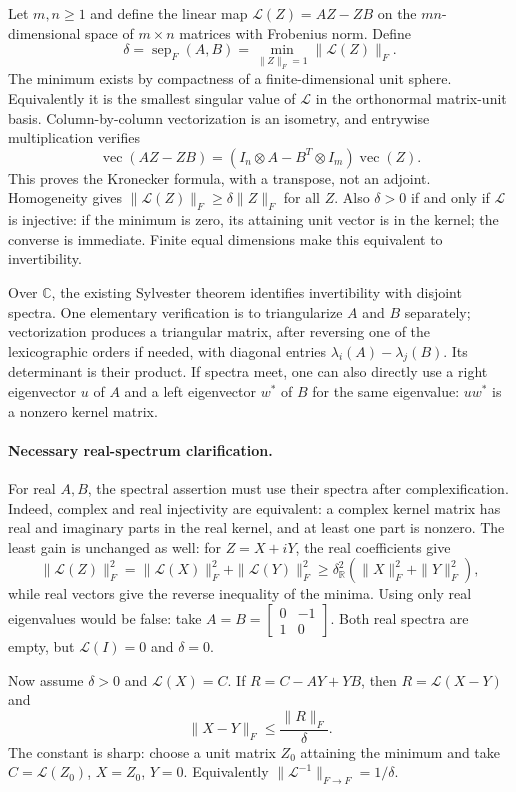 \documentclass[11pt,a4paper]{article}
\newcommand{\R}{\mathbb R}
\newcommand{\C}{\mathbb C}
\begin{document}
Let $m,n\ge1$ and define the linear map
$\mathcal L(Z)=AZ-ZB$ on the $mn$-dimensional space of $m\times n$
matrices with Frobenius norm. Define
\[
 \delta=\operatorname{sep}_F(A,B)
 =\min_{\|Z\|_F=1}\|\mathcal L(Z)\|_F.
\]
The minimum exists by compactness of a finite-dimensional unit sphere.
Equivalently it is the smallest singular value of $\mathcal L$ in
the orthonormal matrix-unit basis. Column-by-column vectorization is
an isometry, and entrywise multiplication verifies
\[
 \operatorname{vec}(AZ-ZB)
 =(I_n\otimes A-B^T\otimes I_m)\operatorname{vec}(Z).
\]
This proves the Kronecker formula, with a transpose, not an adjoint.
Homogeneity gives $\|\mathcal L(Z)\|_F\ge\delta\|Z\|_F$ for all $Z$.
Also $\delta>0$ if and only if $\mathcal L$ is injective: if the
minimum is zero, its attaining unit vector is in the kernel; the
converse is immediate. Finite equal dimensions make this equivalent
to invertibility.

Over $\C$, the existing Sylvester theorem identifies invertibility
with disjoint spectra. One elementary verification is to triangularize
$A$ and $B$ separately; vectorization produces a triangular matrix,
after reversing one of the lexicographic orders if needed, with
diagonal entries $\lambda_i(A)-\lambda_j(B)$. Its determinant is their
product. If spectra meet, one can also directly use a right eigenvector
$u$ of $A$ and a left eigenvector $w^*$ of $B$ for the same eigenvalue:
$uw^*$ is a nonzero kernel matrix.

\paragraph{Necessary real-spectrum clarification.}
For real $A,B$, the spectral assertion must use their spectra after
complexification. Indeed, complex and real injectivity are equivalent:
a complex kernel matrix has real and imaginary parts in the real
kernel, and at least one part is nonzero. The least gain is unchanged
as well: for $Z=X+iY$, the real coefficients give
\[
 \|\mathcal L(Z)\|_F^2
 =\|\mathcal L(X)\|_F^2+\|\mathcal L(Y)\|_F^2
 \ge\delta_{\R}^2(\|X\|_F^2+\|Y\|_F^2),
\]
while real vectors give the reverse inequality of the minima.
Using only real eigenvalues would be false: take
$A=B=\begin{bmatrix}0&-1\\1&0\end{bmatrix}$. Both real spectra are
empty, but $\mathcal L(I)=0$ and $\delta=0$.

Now assume $\delta>0$ and $\mathcal L(X)=C$. If
$R=C-AY+YB$, then $R=\mathcal L(X-Y)$ and
\begin{equation}\label{eq:eq-sep-residual}
 \|X-Y\|_F\le\frac{\|R\|_F}{\delta}.
\end{equation}
The constant is sharp: choose a unit matrix $Z_0$ attaining the minimum
and take $C=\mathcal L(Z_0)$, $X=Z_0$, $Y=0$. Equivalently
$\|\mathcal L^{-1}\|_{F\to F}=1/\delta$.
\end{document}
